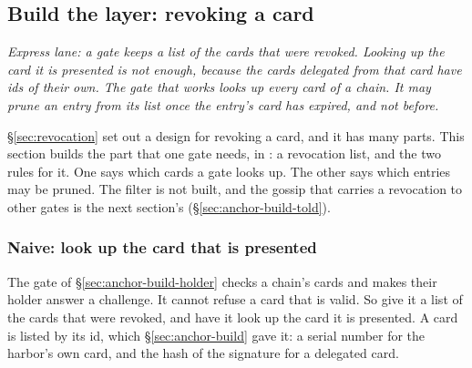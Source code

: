 %
%
\subsection{Build the layer: revoking a card}
\label{sec:anchor-build-taken-back}

\noindent\emph{Express lane: a gate keeps a list of the cards that were
revoked. Looking up the card it is presented is not enough, because the
cards delegated from that card have ids of their own. The gate that works
looks up every card of a chain. It may prune an entry from its list once the
entry's card has expired, and not before.}

\S\ref{sec:revocation} set out a design for revoking a card, and it
has many parts. This section builds the part that one gate needs, in
\pdkernelname{}: a revocation list, and the two rules for it. One says which
cards a gate looks up. The other says which entries may be pruned. The
filter is not built, and the gossip that carries a revocation to other gates
is the next section's (\S\ref{sec:anchor-build-told}).

\subsubsection{Naive: look up the card that is presented}

The gate of \S\ref{sec:anchor-build-holder} checks a chain's cards and
makes their holder answer a challenge. It cannot refuse a card that is
valid. So give it a list of the cards that were revoked, and have it
look up the card it is presented. A card is listed by its id, which
\S\ref{sec:anchor-build} gave it: a serial number for the harbor's own
card, and the hash of the signature for a delegated card.


